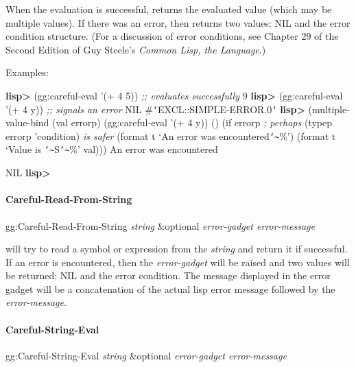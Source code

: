 When the evaluation is successful,  returns the evaluated
value (which may be multiple values).  If there was an error, then
 returns two values: NIL and the error condition structure.
(For a discussion of error conditions, see Chapter 29 of the Second Edition
of Guy Steele's {\it Common Lisp, the Language}.)

Examples:

\begin{programexample}
{\bf lisp>} (gg:careful-eval '(+ 4 5))    {\it ;; evaluates successfully}
9
{\bf lisp>} (gg:careful-eval '(+ 4 y))    {\it ;; signals an error}
NIL
\#{\tt\char`\<}EXCL::SIMPLE-ERROR.0{\tt\char`\>}
{\bf lisp>} (multiple-value-bind (val errorp)
         (gg:careful-eval '(+ 4 y))
()       (if errorp   {\it ; perhaps} (typep errorp 'condition) {\it is safer}
           (format t `An error was encountered{\tt\char`\~}\%')
           (format t `Value is {\tt\char`\~}S{\tt\char`\~}\%' val)))
An error was encountered

NIL
{\bf lisp>}
\end{programexample}


\paragraph{Careful-Read-From-String}

\begin{programexample}
gg:Careful-Read-From-String {\it string} \&optional {\it error-gadget  error-message} \value{function}
\end{programexample}

 will try to read a symbol or expression from the
{\it string} and return it if successful.  If an error is encountered, then the
{\it error-gadget} will be raised and two values will be returned: NIL and the
error condition.  The message displayed in the error gadget will be a
concatenation of the actual lisp error message followed by the
{\it error-message}.


\paragraph{Careful-String-Eval}

\begin{programexample}
gg:Careful-String-Eval {\it string} \&optional {\it error-gadget  error-message} \value{function}
\end{programexample}

